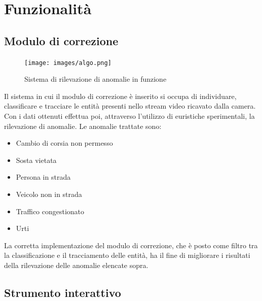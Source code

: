 \chapter{Funzionalità}
\label{sec:funzionalita}

\section{Modulo di correzione}

\begin{figure}
    \caption{Sistema di rilevazione di anomalie in funzione}
    \label{fig:anomalie}
    \centering
    \texttt{[image: images/algo.png]}
\end{figure}

Il sistema in cui il modulo di correzione è inserito si occupa di individuare, classificare e tracciare le entità presenti nello stream video ricavato dalla camera.
Con i dati ottenuti effettua poi, attraverso l'utilizzo di euristiche sperimentali, la rilevazione di anomalie.
Le anomalie trattate sono:
\begin{itemize}
    \item Cambio di corsia non permesso
    \item Sosta vietata
    \item Persona in strada 
    \item Veicolo non in strada
    \item Traffico congestionato
    \item Urti
\end{itemize}
La corretta implementazione del modulo di correzione, che è posto come filtro tra la classificazione e il tracciamento delle entità, ha il fine di migliorare i risultati della rilevazione delle anomalie elencate sopra.

\section{Strumento interattivo}

